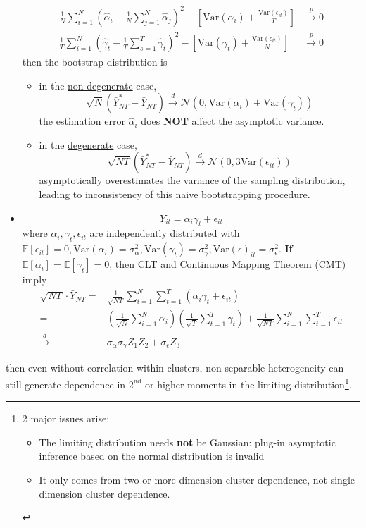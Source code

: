 \documentclass[twoside]{article}
\begin{document}
\begin{itemize}
\begin{align*}
        \frac{1}{N}\sum^N_{i=1}\left(\hat{\alpha}_i - \frac{1}{N}\sum^N_{j=1}\hat{\alpha}_j\right)^2 - \left[\mathrm{Var}(\alpha_i) + \frac{\mathrm{Var}(\epsilon_{it})}{T}\right] & \xrightarrow{p} 0\\
        \frac{1}{T}\sum^N_{i=1}\left(\hat{\gamma}_t - \frac{1}{T}\sum^T_{s=1}\hat{\gamma}_t\right)^2 - \left[\mathrm{Var}(\gamma_t) + \frac{\mathrm{Var}(\epsilon_{it})}{N}\right] & \xrightarrow{p} 0
    \end{align*}
    then the bootstrap distribution is
    \begin{itemize}
        \item in the \underline{non-degenerate} case, $$ \sqrt{N}\left( \bar{Y}^*_{NT}-\bar{Y}_{NT} \right) \xrightarrow{d} \mathcal{N}\left(0,\mathrm{Var}(\alpha_i) + \mathrm{Var}(\gamma_t)\right) $$
        the estimation error $\hat{\alpha}_i$ does \textbf{NOT} affect the asymptotic variance.
        \item in the \underline{degenerate} case, $$ \sqrt{NT}\left(\bar{Y}^*_{NT}-\bar{Y}_{NT}\right) \xrightarrow{d} \mathcal{N}\left(0,3\mathrm{Var}(\epsilon_{it})\right) $$
        asymptotically overestimates the variance of the sampling distribution, leading to inconsistency of this naive bootstrapping procedure.
    \end{itemize}
    \item {} $$ Y_{it} = \alpha_i \gamma_t + \epsilon_{it} $$
    where $\alpha_i,\gamma_t,\epsilon_{it}$ are independently distributed with $\mathbb{E}\left[\epsilon_{it}\right] = 0,\mathrm{Var}(\alpha_i) = \sigma^2_{\alpha},\mathrm{Var}(\gamma_t) = \sigma^2_{\gamma}, \mathrm{Var}(\epsilon)_{it}=\sigma^2_{\epsilon}$. \textbf{If} $\mathbb{E}\left[\alpha_i\right] = \mathbb{E}\left[\gamma_t\right] = 0$, then CLT and Continuous Mapping Theorem (CMT) imply 
    \begin{align*}
        \sqrt{NT} \cdot \bar{Y}_{NT} =& \frac{1}{\sqrt{NT}} \sum^N_{i=1}\sum^T_{t=1} \left(\alpha_i \gamma_t +\epsilon_{it}\right)\\
        =& \left( \frac{1}{\sqrt{N}} \sum^N_{i=1}\alpha_i \right) \left(\frac{1}{\sqrt{T}} \sum^T_{t=1}\gamma_t \right) + \frac{1}{\sqrt{NT}}\sum^N_{i=1}\sum^T_{t=1}\epsilon_{it}\\
        \xrightarrow{d}& \sigma_{\alpha}\sigma_{\gamma}Z_1Z_2 + \sigma_{\epsilon}Z_3
    \end{align*}
\end{itemize}
then even without correlation within clusters, non-separable heterogeneity can still generate dependence in $2^{\text{nd}}$ or higher moments in the limiting distribution\footnote{2 major issues arise:\begin{itemize}
    \item The limiting distribution needs \textbf{not} be Gaussian: plug-in asymptotic inference based on the normal distribution is invalid 
    \item It only comes from two-or-more-dimension cluster dependence, not single-dimension cluster dependence.
\end{itemize}
}.
\end{document}
